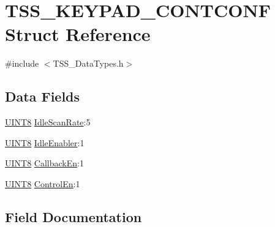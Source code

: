 \hypertarget{struct_t_s_s___k_e_y_p_a_d___c_o_n_t_c_o_n_f}{}\section{T\+S\+S\+\_\+\+K\+E\+Y\+P\+A\+D\+\_\+\+C\+O\+N\+T\+C\+O\+NF Struct Reference}
\label{struct_t_s_s___k_e_y_p_a_d___c_o_n_t_c_o_n_f}


{\ttfamily \#include $<$T\+S\+S\+\_\+\+Data\+Types.\+h$>$}

\subsection*{Data Fields}
\begin{DoxyCompactItemize}
\item 
\hyperlink{_t_s_s___data_types_8h_ab27e9918b538ce9d8ca692479b375b6a}{U\+I\+N\+T8} \hyperlink{struct_t_s_s___k_e_y_p_a_d___c_o_n_t_c_o_n_f_a99c7b7e52704391b686df20f28596c3d}{Idle\+Scan\+Rate}\+:5
\item 
\hyperlink{_t_s_s___data_types_8h_ab27e9918b538ce9d8ca692479b375b6a}{U\+I\+N\+T8} \hyperlink{struct_t_s_s___k_e_y_p_a_d___c_o_n_t_c_o_n_f_aa5bc869699904b94a79c7e91a79e82f4}{Idle\+Enabler}\+:1
\item 
\hyperlink{_t_s_s___data_types_8h_ab27e9918b538ce9d8ca692479b375b6a}{U\+I\+N\+T8} \hyperlink{struct_t_s_s___k_e_y_p_a_d___c_o_n_t_c_o_n_f_a076afc7f5cfd54a08c9c0e27b18b348b}{Callback\+En}\+:1
\item 
\hyperlink{_t_s_s___data_types_8h_ab27e9918b538ce9d8ca692479b375b6a}{U\+I\+N\+T8} \hyperlink{struct_t_s_s___k_e_y_p_a_d___c_o_n_t_c_o_n_f_aedd39d6b04d98167b4957b1f89a9c302}{Control\+En}\+:1
\end{DoxyCompactItemize}


\subsection{Field Documentation}
\mbox{\label{struct_t_s_s___k_e_y_p_a_d___c_o_n_t_c_o_n_f_a076afc7f5cfd54a08c9c0e27b18b348b}} 
